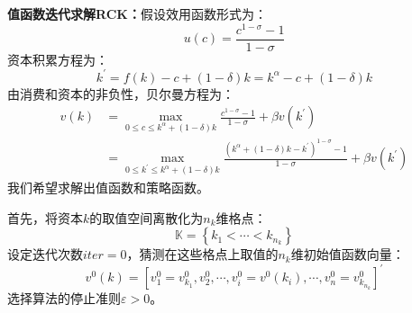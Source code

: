\begin{example}
    \textbf{值函数迭代求解RCK：}假设效用函数形式为：
    \begin{equation*}
        u(c) = \frac{c^{1-\sigma}-1}{1-\sigma}
    \end{equation*}
    资本积累方程为：
    \begin{equation*}
        k^{\prime} = f(k) - c + (1-\delta)k = k^{\alpha} - c + (1-\delta)k
    \end{equation*}
    由消费和资本的非负性，贝尔曼方程为：
    \begin{equation*}
        \begin{aligned}
            v(k) &= \max _{0 \leq c \leq k^\alpha+(1-\delta) k} 
                \frac{c^{1-\sigma}-1}{1-\sigma}+\beta v\left(k^{\prime}\right) \\
            &= \max_{0\leq k^{\prime} \leq k^\alpha+(1-\delta) k}
                \frac{\left(k^\alpha+(1-\delta) k-k^{\prime}\right)^{1-\sigma}-1}{1-\sigma}+\beta v\left(k^{\prime}\right)
        \end{aligned}
    \end{equation*}
    我们希望求解出值函数和策略函数。

    首先，将资本$k$的取值空间离散化为$n_k$维格点：
    \begin{equation*}
        \mathbb{K}=\left\{k_1 < \cdots < k_{n_k}\right\}
    \end{equation*}
    设定迭代次数$iter=0$，猜测在这些格点上取值的$n_k$维初始值函数向量：
    \begin{equation*}
        v^0(k) = \left[v^0_1=v^0_{k_{1}},v^0_2,\cdots,v^0_i=v^0(k_i),\cdots,v^0_n=v^0_{k_{n_k}}\right]^{\prime}
    \end{equation*}
    选择算法的停止准则$\varepsilon>0$。


\end{example}
